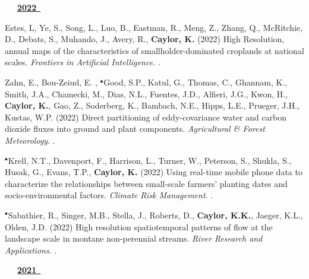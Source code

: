 \begin{etaremune}
\vspace{0.1in}
\mbox{\ \ \ \underline{\textbf{2022 }}}
\vspace{0.1in}

\item Estes, L, Ye, S., Song, L., Luo, B., Eastman, R., Meng, Z., Zhang, Q., McRitchie, D., Debats, S., Muhando, J., Avery, R., \textbf{ Caylor, K.} (2022) High Resolution, annual maps of the characteristics of smallholder-dominated croplands at national scales. \emph{Frontiers in Artificial Intelligence}. .
\item Zahn, E., Bou-Zeiud, E. , $^{\blacktriangle}$Good, S.P., Katul, G., Thomas, C., Ghannam, K., Smith, J.A., Chamecki, M., Dias, N.L., Fuentes, J.D., Alfieri, J.G., Kwon, H., \textbf{ Caylor, K.}, Gao, Z., Soderberg, K., Bambach, N.E., Hipps, L.E., Prueger, J.H., Kustas, W.P. (2022) Direct partitioning of eddy-covariance water and carbon dioxide fluxes into ground and plant components. \emph{Agricultural \& Forest Meteorology}. .
\item $^{\blacktriangle}$Krell, N.T., Davenport, F., Harrison, L., Turner, W., Peterson, S., Shukla, S., Husak, G., Evans, T.P., \textbf{ Caylor, K.} (2022) Using real-time mobile phone data to characterize the relationships between small-scale farmers' planting dates and socio-environmental factors. \emph{Climate Risk Management}. .
\item $^{\bullet}$Sabathier, R., Singer, M.B., Stella, J., Roberts, D., \textbf{ Caylor, K.K.}, Jaeger, K.L., Olden, J.D. (2022) High resolution spatiotemporal patterns of flow at the landscape scale in montane non-perennial streams. \emph{River Research and Applications}. .

\vspace{0.1in}
\mbox{\ \ \ \underline{\textbf{2021 }}}
\vspace{0.1in}


\end{etaremune}
